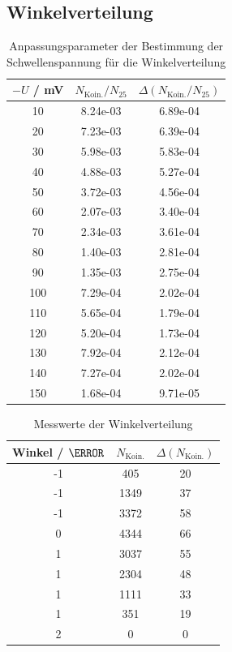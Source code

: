 \documentclass{article}
\begin{document}
\subsection*{Winkelverteilung}
\begin{table}[H]
    \centering
    \caption{Anpassungsparameter der Bestimmung der Schwellenspannung für die Winkelverteilung}
    \begin{tabular}{|c|c|c|}
        \hline
        $-U$ / mV & $N_\mathrm{Koin.}/N_{25}$ & $\Delta (N_\mathrm{Koin.}/N_{25})$ \\ \hline
        10 & 8.24e-03 & 6.89e-04 \\ \hline
        20 & 7.23e-03 & 6.39e-04 \\ \hline
        30 & 5.98e-03 & 5.83e-04 \\ \hline
        40 & 4.88e-03 & 5.27e-04 \\ \hline
        50 & 3.72e-03 & 4.56e-04 \\ \hline
        60 & 2.07e-03 & 3.40e-04 \\ \hline
        70 & 2.34e-03 & 3.61e-04 \\ \hline
        80 & 1.40e-03 & 2.81e-04 \\ \hline
        90 & 1.35e-03 & 2.75e-04 \\ \hline
        100 & 7.29e-04 & 2.02e-04 \\ \hline
        110 & 5.65e-04 & 1.79e-04 \\ \hline
        120 & 5.20e-04 & 1.73e-04 \\ \hline
        130 & 7.92e-04 & 2.12e-04 \\ \hline
        140 & 7.27e-04 & 2.02e-04 \\ \hline
        150 & 1.68e-04 & 9.71e-05 \\ \hline
    \end{tabular}   
    \label{tab:SchwellenspannungWinkelverteilung}
\end{table}

\begin{table}
    \centering
    \caption{Messwerte der Winkelverteilung}
    \begin{tabular}{|c|c|c|}
        \hline
        Winkel / $\degree$ & $N_\mathrm{Koin.}$ & $\Delta (N_\mathrm{Koin.})$ \\ \hline
        -1 & 405 & 20 \\ \hline
        -1 & 1349 & 37 \\ \hline
        -1 & 3372 & 58 \\ \hline
        0 & 4344 & 66 \\ \hline
        1 & 3037 & 55 \\ \hline
        1 & 2304 & 48 \\ \hline
        1 & 1111 & 33 \\ \hline
        1 & 351 & 19 \\ \hline
        2 & 0 & 0 \\ \hline
    \end{tabular}
    \label{tab:Winkelverteilung}
\end{table}
\end{document}

